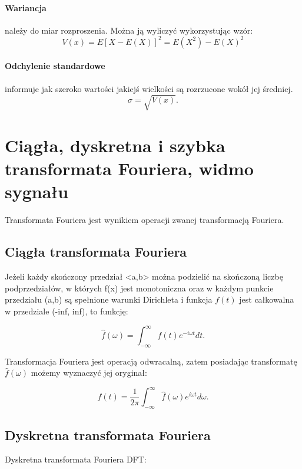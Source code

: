 \documentclass[]{report}
\begin{document}
\paragraph{Wariancja} należy do miar rozproszenia. Można ją wyliczyć wykorzystując wzór:
\begin{equation}
V(x) = E[X - E(X)]^2 = E(X^2)-E(X)^2
\end{equation}
\medskip

\paragraph{Odchylenie standardowe} informuje jak szeroko wartości jakiejś wielkości są rozrzucone wokół jej średniej. 
\begin{equation}
\sigma = \sqrt{V(x)}.
\end{equation}



\section{Ciągła, dyskretna i szybka transformata Fouriera, widmo sygnału}
Transformata Fouriera jest wynikiem operacji zwanej transformacją Fouriera.
\subsection{Ciągła transformata Fouriera}
Jeżeli każdy skończony przedział <a,b> można podzielić na skończoną    liczbę    podprzedziałów,    w    których f(x) jest monotoniczna   oraz   w   każdym   punkcie   przedziału (a,b) są spełnione  warunki  Dirichleta  i  funkcja $f(t)$ jest  całkowalna  w przedziale (-inf, inf), to funkcję:

\begin{equation}
\hat{f}(\omega)=\int_{-\infty }^{\infty}f(t) e^{-i\omega t}dt .
\end{equation}

Transformacja   Fouriera   jest   operacją   odwracalną,   zatem posiadając transformatę $\hat{f}(\omega)$ możemy wyznaczyć jej oryginał:

\begin{equation}
f(t)= \dfrac{1}{2\pi} \int_{-\infty }^{\infty}\hat{f}(\omega) e^{i\omega t}d\omega .
\end{equation}

\subsection{Dyskretna transformata Fouriera}
Dyskretna transformata Fouriera DFT:
\end{document}
